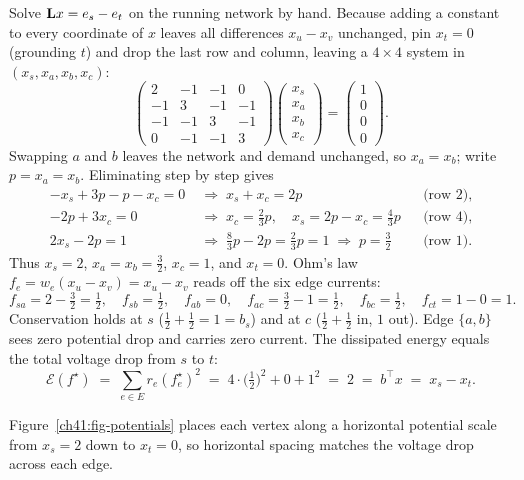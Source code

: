 \begin{labbox}
Solve $\mathbf{L} x = e_s - e_t$ on the running network by hand. Because adding a constant to every coordinate of $x$ leaves all differences $x_u - x_v$ unchanged, pin $x_t = 0$ (grounding $t$) and drop the last row and column, leaving a $4\times 4$ system in $(x_s,x_a,x_b,x_c)$:
\[
  \begin{pmatrix} 2&-1&-1&0\\ -1&3&-1&-1\\ -1&-1&3&-1\\ 0&-1&-1&3\end{pmatrix}
  \begin{pmatrix}x_s\\x_a\\x_b\\x_c\end{pmatrix}
  =\begin{pmatrix}1\\0\\0\\0\end{pmatrix}.
\]
Swapping $a$ and $b$ leaves the network and demand unchanged, so $x_a = x_b$; write $p = x_a = x_b$. Eliminating step by step gives
\begin{align*}
  -x_s + 3p - p - x_c = 0 &\;\Longrightarrow\; x_s + x_c = 2p &&\text{(row 2)}, \\
  -2p + 3x_c = 0 &\;\Longrightarrow\; x_c = \tfrac{2}{3}p,\quad x_s = 2p - x_c = \tfrac{4}{3}p &&\text{(row 4)}, \\
  2x_s - 2p = 1 &\;\Longrightarrow\; \tfrac{8}{3}p - 2p = \tfrac{2}{3}p = 1 \;\Longrightarrow\; p = \tfrac{3}{2} &&\text{(row 1)}.
\end{align*}
Thus $x_s = 2$, $x_a = x_b = \tfrac{3}{2}$, $x_c = 1$, and $x_t = 0$. Ohm's law $f_e = w_e(x_u - x_v) = x_u - x_v$ reads off the six edge currents:
\[
  f_{sa}=2-\tfrac{3}{2}=\tfrac{1}{2},\quad f_{sb}=\tfrac{1}{2},\quad f_{ab}=0,\quad
  f_{ac}=\tfrac{3}{2}-1=\tfrac{1}{2},\quad f_{bc}=\tfrac{1}{2},\quad f_{ct}=1-0=1.
\]
Conservation holds at $s$ ($\tfrac{1}{2}+\tfrac{1}{2}=1=b_s$) and at $c$ ($\tfrac{1}{2}+\tfrac{1}{2}$ in, $1$ out). Edge $\{a,b\}$ sees zero potential drop and carries zero current. The dissipated energy equals the total voltage drop from $s$ to $t$:
\[
  \mathcal{E}(f^\star) \;=\; \sum_{e \in E} r_e (f^\star_e)^2 \;=\; 4\cdot\bigl(\tfrac{1}{2}\bigr)^2 + 0 + 1^2 \;=\; 2 \;=\; b^\top x \;=\; x_s - x_t .
\]
\end{labbox}

Figure~\ref{ch41:fig-potentials} places each vertex along a horizontal potential scale from $x_s=2$ down to $x_t=0$, so horizontal spacing matches the voltage drop across each edge.

